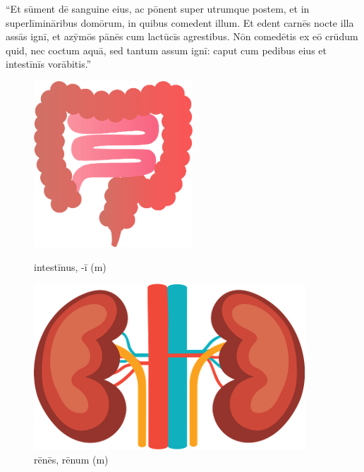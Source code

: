 ``Et sūment dē sanguine eius,
ac pōnent super utrumque postem, et in
superlīmināribus domōrum, in quibus comedent illum. Et edent carnēs nocte illa
assās ignī, et
azȳmōs pānēs cum lactūcīs agrestibus. Nōn
comedētis ex eō crūdum quid, nec coctum aquā, sed tantum
assum ignī: caput cum pedibus eius et intestīnīs
vorābitis.''

\begin{figure}[h!]
    \begin{minipage}[hp]{0.5\linewidth}
        \centering
        \includegraphics{intestine}
        \caption{intestīnus, -ī (m)}
    \end{minipage}%
    \begin{minipage}[hp]{0.5\linewidth}
        \centering
        \includegraphics{renes}
        \caption{rēnēs, rēnum (m)}
    \end{minipage}
\end{figure}

